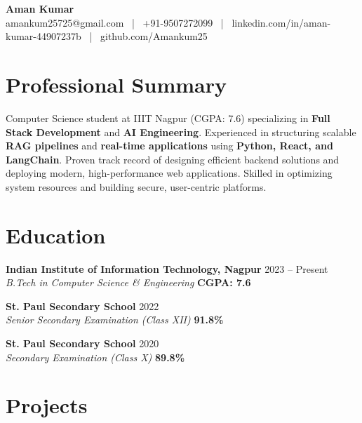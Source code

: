\documentclass[10pt, letterpaper]{article}
\begin{document}
\begin{center}
    {\huge \textbf{Aman Kumar}} \\ [3pt]
    amankum25725@gmail.com \ | \ +91-9507272099 \ | \ linkedin.com/in/aman-kumar-44907237b \ | \ github.com/Amankum25
\end{center}

\section{Professional Summary}
Computer Science student at IIIT Nagpur (CGPA: 7.6) specializing in \textbf{Full Stack Development} and \textbf{AI Engineering}. Experienced in structuring scalable \textbf{RAG pipelines} and \textbf{real-time applications} using \textbf{Python, React, and LangChain}. Proven track record of designing efficient backend solutions and deploying modern, high-performance web applications. Skilled in optimizing system resources and building secure, user-centric platforms.

\section{Education}
\noindent \textbf{Indian Institute of Information Technology, Nagpur} \hfill 2023 -- Present \\
\textit{B.Tech in Computer Science \& Engineering} \hfill \textbf{CGPA: 7.6}
\vspace{4pt}

\noindent \textbf{St. Paul Secondary School} \hfill 2022 \\
\textit{Senior Secondary Examination (Class XII)} \hfill \textbf{91.8\%}
\vspace{4pt}

\noindent \textbf{St. Paul Secondary School} \hfill 2020 \\
\textit{Secondary Examination (Class X)} \hfill \textbf{89.8\%}

\section{Projects}
\end{document}
